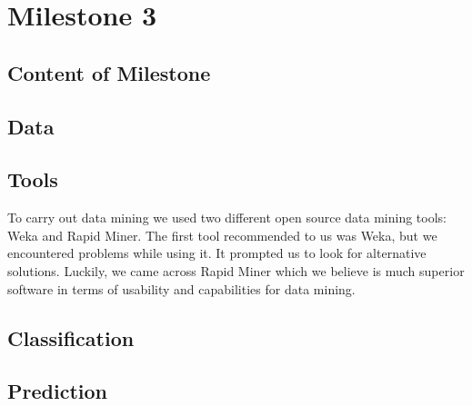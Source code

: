 


\chapter{Milestone 3} \label{cha:ml3}
    \section{Content of Milestone} 
        \label{sec:ml3_content}
    

    \section{Data} 
        \label{sec:ml3_data}
    

    \section{Tools} %
    \label{sub:Tools}
    To carry out data mining we used two different open source data mining tools: Weka and Rapid Miner. The first tool recommended to us was Weka, but we encountered problems while using it. It prompted us to look for alternative solutions. Luckily, we came across Rapid Miner which we believe is much superior software in terms of usability and capabilities for data mining.
    
    

    \section{Classification} %
    \label{sec:Classification}
    

    \section{Prediction} %
    \label{sub:Prediction}
    

    


